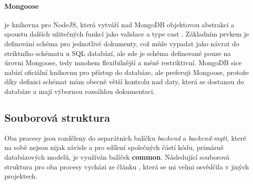 \paragraph{Mongoose} je knihovna pro NodeJS, která vytváří nad MongoDB objektovou abstrakci a spoustu dalších užitečných funkcí jako validace a type cast \cite{mongoose}. Základním prvkem je definování schéma pro jednotlivé dokumenty, což může vypadat jako návrat do striktního schématu u SQL databází, ale zde je schéma definované pouze na úrovni Mongoose, tedy mnohem flexibilnější a méně restriktivní. MongoDB sice nabízí oficiální knihovnu pro přístup do databáze, ale preferuji Mongoose, protože díky definici schémat mám obecně větší kontrolu nad daty, která se dostanou do databáze a mají výbornou rozsáhlou dokumentaci.

\subsection{Souborová struktura}
Oba procesy jsou rozděleny do separátních balíčku \textit{backend} a \textit{backend-mqtt}, které na sobě nejsou nijak závisle a pro sdílení společných částí kódu, primárně databázových modelů, je využíván balíček \textbf{common}. Následující souborová struktura pro oba procesy vychází ze článku \cite[Bulletproof node.js project architecture]{bolletproof-architecture}, která se mi velmi osvědčila v jiných projektech.



